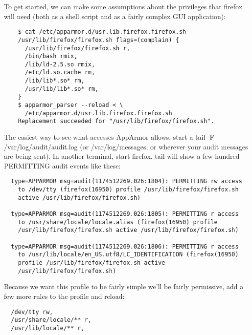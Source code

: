 \documentclass[a4paper]{article}
\renewcommand{\H}{\hspace{0pt}}
\begin{document}
To get started, we can make some assumptions about the privileges that
firefox will need (both as a shell script and as a fairly complex GUI
application):

\begin{small}
\begin{verbatim}
    $ cat /etc/apparmor.d/usr.lib.firefox.firefox.sh
    /usr/lib/firefox/firefox.sh flags=(complain) {
      /usr/lib/firefox/firefox.sh r,
      /bin/bash rmix,
      /lib/ld-2.5.so rmix,
      /etc/ld.so.cache rm,
      /lib/lib*.so* rm,
      /usr/lib/lib*.so* rm,
    }
    $ apparmor_parser --reload < \
      /etc/apparmor.d/usr.lib.firefox.firefox.sh
    Replacement succeeded for "/usr/lib/firefox/firefox.sh".
\end{verbatim}
\end{small}

The easiest way to see what accesses AppArmor allows, start a tail -F
/var/{\H}log/{\H}audit/{\H}audit.log (or /var/{\H}log/{\H}messages, or wherever your audit
messages are being sent).  In another terminal, start firefox. tail will
show a few hundred PERMITTING audit events like these:

\begin{small}
\begin{verbatim}
  type=APPARMOR msg=audit(1174512269.026:1804): PERMITTING rw access
    to /dev/tty (firefox(16950) profile /usr/lib/firefox/firefox.sh
    active /usr/lib/firefox/firefox.sh)

  type=APPARMOR msg=audit(1174512269.026:1805): PERMITTING r access
    to /usr/share/locale/locale.alias (firefox(16950) profile
    /usr/lib/firefox/firefox.sh active /usr/lib/firefox/firefox.sh)

  type=APPARMOR msg=audit(1174512269.026:1806): PERMITTING r access
    to /usr/lib/locale/en_US.utf8/LC_IDENTIFICATION (firefox(16950)
    profile /usr/lib/firefox/firefox.sh active
    /usr/lib/firefox/firefox.sh)
\end{verbatim}
\end{small}

Because we want this profile to be fairly simple we'll be fairly
permissive, add a few more rules to the profile and reload:

\begin{small}
\begin{verbatim}
  /dev/tty rw,
  /usr/share/locale/** r,
  /usr/lib/locale/** r,
\end{verbatim}
\end{small}
\end{document}

